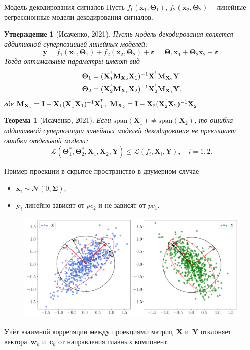\documentclass[10pt]{beamer}
\renewcommand{\leq}{\ensuremath{\leqslant}}
\newcommand{\bc}{\mathbf{c}}
\newcommand{\bw}{\mathbf{w}}
\newcommand{\bx}{\mathbf{x}}
\newcommand{\by}{\mathbf{y}}
\newcommand{\bI}{\mathbf{I}}
\newcommand{\bM}{\mathbf{M}}
\newcommand{\bX}{\mathbf{X}}
\newcommand{\bY}{\mathbf{Y}}
\newcommand{\cL}{\mathcal{L}}
\newcommand{\bTheta}{\boldsymbol{\Theta}}
\newcommand{\T}{^{\text{\tiny\sffamily\upshape\mdseries T}}}
\newtheorem{statement}{Утверждение}
\newtheorem{rustheorem}{Теорема}
\begin{document}
\begin{frame}{Модель декодирования сигналов}
	Пусть $f_1(\bx_1, \bTheta_1)$, $f_2(\bx_2, \bTheta_2)$ -- линейные регрессионные модели декодирования сигналов. 
	\begin{statement}[Исаченко, 2021]
		Пусть модель декодирования является аддитивной суперпозицией линейных моделей:
		\[
			\by = f_1(\bx_1, \bTheta_1) + f_2(\bx_2, \bTheta_2) + \boldsymbol{\varepsilon} = \bTheta_1 \bx_1 + \bTheta_2 \bx_2 + \boldsymbol{\varepsilon}.
		\]
		Тогда оптимальные параметры имеют вид
		\vspace{-0.2cm}
		\begin{align*}
			\bTheta_1 &= (\bX_1^{\T} \bM_{\bX_2} \bX_1)^{-1} \bX_1^{\T} \bM_{\bX_2} \bY \\
			\bTheta_2 &= (\bX_2^{\T} \bM_{\bX_1} \bX_2)^{-1} \bX_2^{\T} \bM_{\bX_1} \bY,
		\end{align*}
		где $\bM_{\bX_1} = \bI - \bX_1 (\bX_1^{\T} \bX_1)^{-1} \bX_1^{\T}$, $\bM_{\bX_2} = \bI -\bX_2 (\bX_2^{\T} \bX_2)^{-1} \bX_2^{\T}$.
	\end{statement}
	\begin{rustheorem}[Исаченко, 2021]
		Если $\text{span}(\bX_1) \neq \text{span}(\bX_2)$, то ошибка аддитивной суперпозиции линейных моделей декодирования не превышает ошибки отдельной модели:
		\[
			\cL(\bTheta_1^*, \bTheta_2^*, \bX_1, \bX_2, \bY) \leq \cL(f_i, \bX_i, \bY), \quad i = 1, 2.
		\]
	\end{rustheorem}
\end{frame}
\begin{frame}{Пример проекции в скрытое пространство в двумерном случае}
	\begin{itemize}
		\item $\bx_i \sim \mathcal{N}(0, \mathbf{\Sigma})$;
		\item $\by_i$ линейно зависят от $pc_2$ и не зависят от $pc_1$.
	\end{itemize}	
	\begin{figure}[h]
	\centering
	\includegraphics[width=0.95\linewidth]{figs/pls_toy_example}
	\end{figure}
	Учёт взаимной корреляции между проекциями матриц~$\bX$ и~$\bY$ отклоняет вектора~$\bw_k$ и~$\bc_k$ от направления главных компонент. 
\end{frame}
\end{document}
